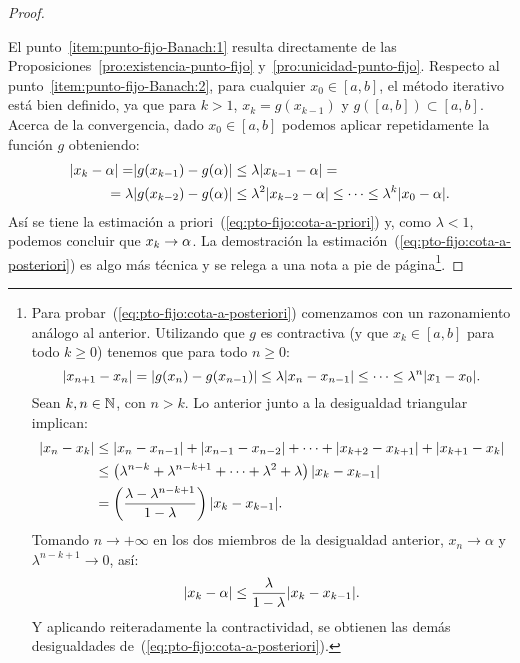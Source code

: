 \begin{proof}~\par
  El punto~\ref{item:punto-fijo-Banach:1} resulta
  directamente de las Proposiciones~\ref{pro:existencia-punto-fijo}
  y~\ref{pro:unicidad-punto-fijo}. Respecto al
  punto~\ref{item:punto-fijo-Banach:2}, para cualquier $x_0\in [a,b]$,
  el método iterativo está bien definido, ya que para $k>1$,
  $x_{k}=g(x_{k-1})$ y $g([a,b])\subset [a,b]$. Acerca de la
  convergencia, dado $x_0\in [a,b]$ podemos aplicar repetidamente la
  función $g$ obteniendo:
  \begin{equation}
    \begin{aligned}
      |x_k-\alpha| = &|g(x_{k-1})-g(\alpha)| \le \lambda
      |x_{k-1}-\alpha| = \\
      = \lambda &|g(x_{k-2})-g(\alpha)| \le \lambda^2
      |x_{k-2}-\alpha| \le \cdots \le \lambda^k |x_0-\alpha|.
    \end{aligned}\label{eq:1}
  \end{equation}
  Así se tiene la estimación a
  priori~(\ref{eq:pto-fijo:cota-a-priori}) y, como
  $\lambda<1$, podemos concluir que $x_k\to\alpha$.
  La demostración la estimación~(\ref{eq:pto-fijo:cota-a-posteriori})
  es algo más técnica y se relega a una nota a pie de página\footnote{
    Para probar~(\ref{eq:pto-fijo:cota-a-posteriori}) comenzamos con
    un razonamiento análogo al anterior. Utilizando que $g$ es
    contractiva (y que $x_k\in [a,b]$ para todo $k\ge 0$) tenemos que
    para todo $n \ge 0$:
    \begin{equation*}
      |x_{n+1}-x_{n}| =
      |g(x_{n})-g(x_{n-1})|\le\lambda|x_{n}-x_{n-1}| \le \cdots \le \lambda^n|x_1-x_0|.
    \end{equation*}
    Sean $k,n\in\operatorname{{\mathbb N}}$, con $n>k$. Lo anterior junto a la
    desigualdad triangular implican:
    \begin{align*}
      |x_n-x_k| &\le |x_n-x_{n-1}| + |x_{n-1}-x_{n-2}| + \cdots +
                  |x_{k+2}-x_{k+1}| + |x_{k+1}-x_{k}|
      \\
                &\le \left(\lambda^{n-k} + \lambda^{n-k+1} +\cdots+
                  \lambda^{2} + \lambda \right) |x_k-x_{k-1}|
      \\
                &=\left(\frac{\lambda-\lambda^{n-k+1}}{1-\lambda}\right)
                  |x_{k}-x_{k-1}|.
    \end{align*}
    Tomando $n\to+\infty$ en los dos miembros de la desigualdad
    anterior, $x_n\to\alpha$ y $\lambda^{n-k+1}\to 0$, así:
    $$
    |x_k-\alpha| \le \frac{\lambda}{1-\lambda}
    |x_{k}-x_{k-1}|.
    $$
    Y aplicando reiteradamente la contractividad, se obtienen las
    demás desigualdades de~(\ref{eq:pto-fijo:cota-a-posteriori}).
  }.
\end{proof}

